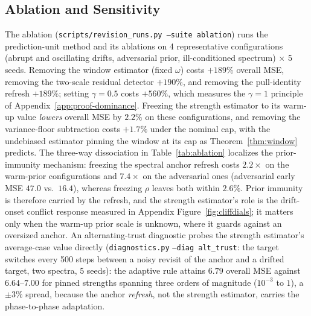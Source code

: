\documentclass[11pt]{article}
\begin{document}
\subsection{Ablation and Sensitivity}
The ablation (\texttt{scripts/revision\_runs.py --suite ablation}) runs the prediction-unit method and its ablations on 4 representative configurations (abrupt and oscillating drifts, adversarial prior, ill-conditioned spectrum) $\times$ 5 seeds.
Removing the window estimator (fixed $\omega$) costs $+189\%$ overall MSE, removing the two-scale residual detector $+190\%$, and removing the pull-identity refresh $+189\%$; setting $\gamma = 0.5$ costs $+560\%$, which measures the $\gamma = 1$ principle of Appendix~\ref{app:proof-dominance}.
Freezing the strength estimator to its warm-up value \emph{lowers} overall MSE by $2.2\%$ on these configurations, and removing the variance-floor subtraction costs $+1.7\%$ under the nominal cap, with the undebiased estimator pinning the window at its cap as Theorem~\ref{thm:window} predicts.
The three-way dissociation in Table~\ref{tab:ablation} localizes the prior-immunity mechanism: freezing the spectral anchor refresh costs $2.2\times$ on the warm-prior configurations and $7.4\times$ on the adversarial ones (adversarial early MSE $47.0$ vs.\ $16.4$), whereas freezing $\rho$ leaves both within $2.6\%$.
Prior immunity is therefore carried by the refresh, and the strength estimator's role is the drift-onset conflict response measured in Appendix Figure~\ref{fig:cliffdials}; it matters only when the warm-up prior scale is unknown, where it guards against an oversized anchor.
An alternating-trust diagnostic probes the strength estimator's average-case value directly (\texttt{diagnostics.py} \texttt{--diag alt\_trust}: the target switches every 500 steps between a noisy revisit of the anchor and a drifted target, two spectra, 5 seeds): the adaptive rule attains $6.79$ overall MSE against $6.64$--$7.00$ for pinned strengths spanning three orders of magnitude ($10^{-3}$ to $1$), a $\pm 3\%$ spread, because the anchor \emph{refresh}, not the strength estimator, carries the phase-to-phase adaptation.
\end{document}
